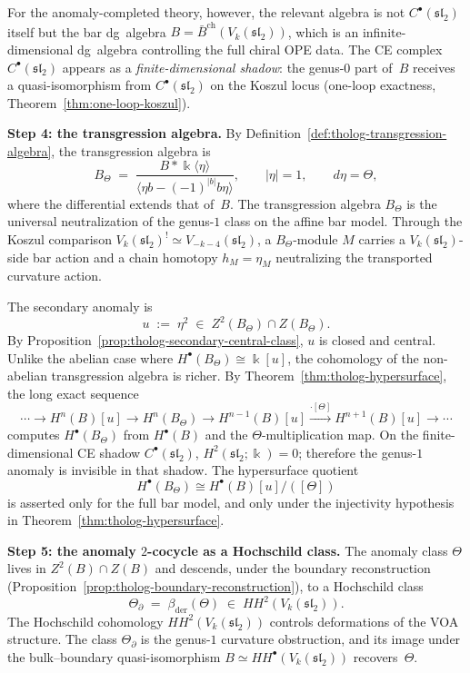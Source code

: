 \begin{construction}
For the anomaly-completed theory, however, the relevant algebra is
not $C^\bullet(\mathfrak{sl}_2)$ itself but the bar dg~algebra
$B = \bar B^{\mathrm{ch}}(V_k(\mathfrak{sl}_2))$, which is an
infinite-dimensional dg~algebra controlling the full chiral OPE data.
The CE complex $C^\bullet(\mathfrak{sl}_2)$ appears as a
\emph{finite-dimensional shadow}: the genus-$0$ part of~$B$
receives a quasi-isomorphism from $C^\bullet(\mathfrak{sl}_2)$ on
the Koszul locus (one-loop exactness,
Theorem~\ref{thm:one-loop-koszul}).

\medskip
\noindent\textbf{Step 4: the transgression algebra.}
By Definition~\ref{def:tholog-transgression-algebra}, the
transgression algebra is
\begin{equation}\label{eq:su2-transgression}
B_\Theta
\;=\;
\frac{B*\Bbbk\langle\eta\rangle}
{\langle\eta b-(-1)^{|b|}b\eta\rangle},
\qquad
|\eta|=1,\qquad d\eta=\Theta,
\end{equation}
where the differential extends that of~$B$. The transgression
algebra \(B_\Theta\) is the universal neutralization of the
genus-\(1\) class on the affine bar model. Through the Koszul
comparison \(V_k(\mathfrak{sl}_2)^!\simeq
V_{-k-4}(\mathfrak{sl}_2)\), a \(B_\Theta\)-module \(M\) carries a
\(V_k(\mathfrak{sl}_2)\)-side bar action and a chain homotopy
\(h_M=\eta_M\) neutralizing the transported curvature action.

The secondary anomaly is
\begin{equation}\label{eq:su2-secondary}
u \;:=\; \eta^2 \;\in\; Z^2(B_\Theta)\cap Z(B_\Theta).
\end{equation}
By Proposition~\ref{prop:tholog-secondary-central-class}, $u$ is
closed and central. Unlike the abelian case where
$H^\bullet(B_\Theta)\cong \Bbbk[u]$, the cohomology of the
non-abelian transgression algebra is richer. By
Theorem~\ref{thm:tholog-hypersurface}, the long exact sequence
\[
\cdots\to
H^n(B)[u]\to H^n(B_\Theta)\to H^{n-1}(B)[u]
\xrightarrow{\cdot[\Theta]}
H^{n+1}(B)[u]\to\cdots
\]
computes $H^\bullet(B_\Theta)$ from \(H^\bullet(B)\) and the
\(\Theta\)-multiplication map. On the finite-dimensional CE shadow
\(C^\bullet(\mathfrak{sl}_2)\), \(H^2(\mathfrak{sl}_2;\Bbbk)=0\);
therefore the genus-\(1\) anomaly is invisible in that shadow. The
hypersurface quotient
\[
H^\bullet(B_\Theta)\cong H^\bullet(B)[u]/([\Theta])
\]
is asserted only for the full bar model, and only under the
injectivity hypothesis in Theorem~\ref{thm:tholog-hypersurface}.

\medskip
\noindent\textbf{Step 5: the anomaly $2$-cocycle as a Hochschild
class.}
The anomaly class $\Theta$ lives in $Z^2(B)\cap Z(B)$ and descends,
under the boundary reconstruction
(Proposition~\ref{prop:tholog-boundary-reconstruction}), to a
Hochschild class
\[
\Theta_\partial
\;=\;
\beta_{\mathrm{der}}(\Theta)
\;\in\;
HH^2(V_k(\mathfrak{sl}_2)).
\]
The Hochschild cohomology $HH^2(V_k(\mathfrak{sl}_2))$ controls
deformations of the VOA structure. The class $\Theta_\partial$ is
the genus-$1$ curvature obstruction, and its image under the
bulk--boundary quasi-isomorphism
$B\simeq HH^\bullet(V_k(\mathfrak{sl}_2))$ recovers~$\Theta$.


\end{construction}
